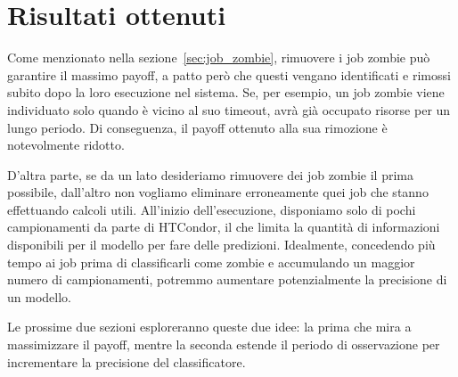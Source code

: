%
%
%
%
%

\section{Risultati ottenuti}

Come menzionato nella sezione~\ref{sec:job_zombie}, rimuovere i job zombie può
garantire il massimo payoff, a patto però che questi vengano identificati e
rimossi subito dopo la loro esecuzione nel sistema. Se, per esempio, un job
zombie viene individuato solo quando è vicino al suo timeout, avrà già
occupato risorse per un lungo periodo. Di conseguenza, il payoff ottenuto alla
sua rimozione è notevolmente ridotto.

D'altra parte, se da un lato desideriamo rimuovere dei job zombie il prima
possibile, dall'altro non vogliamo eliminare erroneamente quei job che stanno
effettuando calcoli utili. All'inizio dell'esecuzione, disponiamo solo di
pochi campionamenti da parte di HTCondor, il che limita la quantità di
informazioni disponibili per il modello per fare delle predizioni. Idealmente,
concedendo più tempo ai job prima di classificarli come zombie e accumulando
un maggior numero di campionamenti, potremmo aumentare potenzialmente la
precisione di un modello.

Le prossime due sezioni esploreranno queste due idee: la prima che mira a
massimizzare il payoff, mentre la seconda estende il periodo di osservazione
per incrementare la precisione del classificatore.

